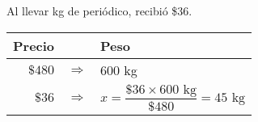 Al llevar \fillin[45][0.8cm] kg de periódico, recibió \$36.

\begin{solutionbox}{2.3cm}\scriptsize
    \begin{tabular}{r>{\centering}p{0.2cm}l}
        \textbf{Precio} &               & \textbf{Peso}                                              \\
        \hline
        $\$480$       & $\Rightarrow$ & $600$ kg                                                     \\
        $\$36$        & $\Rightarrow$ & $x=\dfrac{\$36  \times 600 \text{ kg}}{\$480}=45 \text{ kg}$ \\
    \end{tabular}
\end{solutionbox}